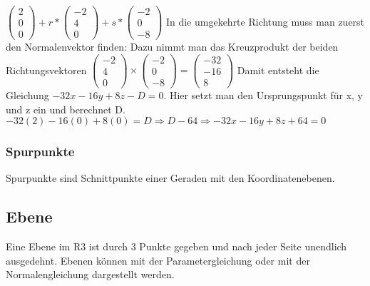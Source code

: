 \documentclass[11pt,a4paper,onecolumn]{scrartcl}
\begin{document}
\begin{flushleft}
$(\begin{smallmatrix} 2 \\ 0 \\ 0 \end{smallmatrix}) + r *(\begin{smallmatrix} -2 \\ 4 \\ 0 \end{smallmatrix}) + s * (\begin{smallmatrix} -2 \\ 0 \\ -8 \end{smallmatrix})$
\newline
In die umgekehrte Richtung muss man zuerst den Normalenvektor finden: \linebreak
Dazu nimmt man das Kreuzprodukt der beiden Richtungsvektoren \linebreak
$(\begin{smallmatrix} -2 \\ 4 \\ 0 \end{smallmatrix}) \times (\begin{smallmatrix} -2 \\ 0 \\ -8 \end{smallmatrix}) = (\begin{smallmatrix} -32 \\ -16 \\ 8 \end{smallmatrix})$ \linebreak
Damit entsteht die Gleichung $-32x - 16y + 8z - D = 0$. Hier setzt man den Ursprungspunkt für x, y und z ein und berechnet D. \linebreak
$-32(2) - 16(0) + 8 (0) = D \Rightarrow D -64 \Rightarrow -32x - 16y + 8z  + 64 = 0$



\subsubsection{Spurpunkte}
Spurpunkte sind Schnittpunkte einer Geraden mit den Koordinatenebenen.

\subsection{Ebene}
Eine Ebene im R3 ist durch 3 Punkte gegeben und nach jeder Seite unendlich ausgedehnt. Ebenen können mit der Parametergleichung oder mit der Normalengleichung dargestellt werden.


\end{flushleft}
\end{document}

